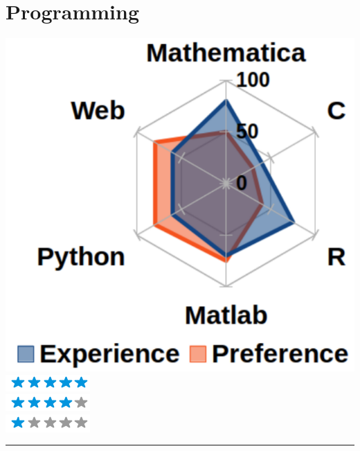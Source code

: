 \documentclass{article}
\begin{document}
\begin{minipage}[t]{0.28\textwidth}
    \section*{\fontsize{18pt}{24pt}\selectfont \color{pblue} Programming}
	\vspace{-2mm}
	\includegraphics[scale=0.3]{../img/programming.pdf}
	\textbf{\LARGE \faLinux}\includegraphics[scale=0.50]{../img/5stars.png}\\
	\textbf{\LARGE \faWindows}\includegraphics[scale=0.50]{../img/4stars.png}\\
	\textbf{\LARGE \faApple}\includegraphics[scale=0.50]{../img/1stars.png}
	\vspace{2mm}
	\hrule
	\vspace{-2mm}

\end{minipage}
\end{document}
